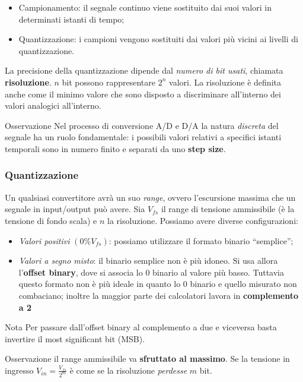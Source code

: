 \documentclass[
]{book}
\providecommand{\tightlist}{%
  \setlength{\itemsep}{0pt}\setlength{\parskip}{0pt}}
\begin{document}
\begin{itemize}
\tightlist
\item
  Campionamento: il segnale continuo viene sostituito dai suoi valori in
  determinati istanti di tempo;
\item
  Quantizzazione: i campioni vengono sostituiti dai valori più vicini ai
  livelli di quantizzazione.
\end{itemize}

La precisione della quantizzazione dipende dal \emph{numero di bit
usati}, chiamata \textbf{risoluzione}. \(n\) bit possono rappresentare
\(2^{n}\) valori. La risoluzione è definita anche come il minimo valore
che sono disposto a discriminare all'interno dei valori analogici
all'interno.

\begin{redbox}{Osservazione}
Nel processo di conversione A/D e D/A la natura \emph{discreta} del segnale ha un ruolo fondamentale: i possibili valori relativi a specifici istanti temporali sono in numero finito e separati da uno \textbf{step size}.
\end{redbox}

\subsubsection{Quantizzazione}\label{quantizzazione}

Un qualsiasi convertitore avrà un suo \emph{range}, ovvero l'escursione
massima che un segnale in input/output può avere. Sia \(V_{fs}\) il
range di tensione ammissibile (è la tensione di fondo scala) e \(n\) la
risoluzione. Possiamo avere diverse configurazioni:

\begin{itemize}
\tightlist
\item
  \emph{Valori positivi} \((0\% V_{fs})\): possiamo utilizzare il
  formato binario ``semplice'';
\item
  \emph{Valori a segno misto}: il binario semplice non è più idoneo. Si
  usa allora l'\textbf{offset binary}, dove si associa lo \(0\) binario
  al valore più basso. Tuttavia questo formato non è più ideale in
  quanto lo \(0\) binario e quello misurato non combaciano; inoltre la
  maggior parte dei calcolatori lavora in \textbf{complemento a 2}
\end{itemize}

\begin{bluebox}{Nota}
Per passare dall'offset binary al complemento a due e viceversa basta invertire il most significant bit (MSB).
\end{bluebox}
\begin{redbox}{Osservazione}
il range ammissibile va \textbf{sfruttato al massimo}. Se la tensione in ingresso $V_{in}=\frac{V_{fs}}{2^{m}}$ è come se la risoluzione \emph{perdesse} $m$ bit.
\end{redbox}
\end{document}
